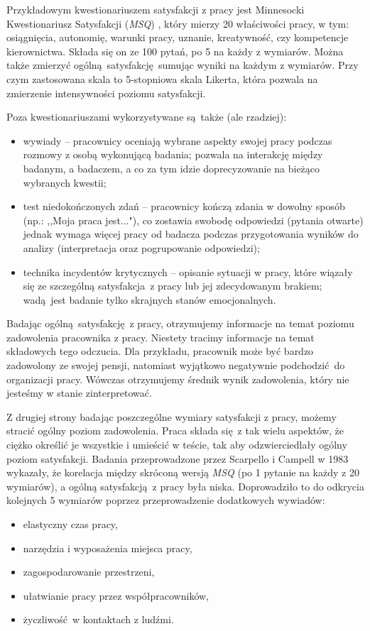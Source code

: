 Przykładowym kwestionariuszem satysfakcji z pracy jest Minnesocki Kwestionariusz Satysfakcji (\emph{MSQ}) \cite{weiss1967manual}, który mierzy 20 właściwości pracy, w tym: osiągnięcia, autonomię, warunki pracy, uznanie, kreatywność, czy kompetencje kierownictwa. Składa się on ze 100 pytań, po 5 na każdy z wymiarów. Można także zmierzyć
ogólną satysfakcję sumując wyniki na każdym z wymiarów. Przy czym zastosowana skala to 5-stopniowa skala Likerta, która pozwala na zmierzenie intensywności poziomu satysfakcji.

Poza kwestionariuszami wykorzystywane są także (ale rzadziej):
\begin{itemize}
\item wywiady -- pracownicy oceniają wybrane aspekty swojej pracy podczas rozmowy z osobą wykonującą badania; pozwala na interakcję między badanym, a badaczem, a co za tym idzie doprecyzowanie na bieżąco wybranych kwestii;
\item test niedokończonych zdań -- pracownicy kończą zdania w dowolny sposób (np.: ,,Moja praca jest..."), co zostawia swobodę odpowiedzi (pytania otwarte) jednak wymaga więcej pracy od badacza podczas przygotowania wyników do analizy (interpretacja oraz pogrupowanie odpowiedzi);
\item technika incydentów krytycznych -- opisanie sytuacji w pracy, które wiązały się ze szczególną satysfakcja z pracy lub jej zdecydowanym brakiem; wadą jest badanie tylko skrajnych stanów emocjonalnych.
\end{itemize}

Badając ogólną satysfakcję z pracy, otrzymujemy informacje na temat poziomu zadowolenia pracownika z pracy. Niestety tracimy informacje na temat składowych tego odczucia. Dla przykładu, pracownik może być bardzo zadowolony ze swojej pensji, natomiast wyjątkowo negatywnie podchodzić do organizacji pracy. Wówczas otrzymujemy średnik wynik zadowolenia, który nie jesteśmy w stanie zinterpretować.

Z drugiej strony badając poszczególne wymiary satysfakcji z pracy, możemy stracić ogólny poziom zadowolenia. Praca składa się z tak wielu aspektów, że ciężko określić je wszystkie i umieścić w teście, tak aby odzwierciedlały ogólny poziom satysfakcji. Badania przeprowadzone przez Scarpello i Campell w 1983 \cite{scarpello1983job} wykazały, że korelacja między skróconą wersją \emph{MSQ} (po 1 pytanie na każdy z 20 wymiarów), a ogólną satysfakcją z pracy była niska. Doprowadziło to do odkrycia
kolejnych 
5 wymiarów poprzez przeprowadzenie dodatkowych wywiadów:
\begin{itemize}
\item elastyczny czas pracy,
\item narzędzia i wyposażenia miejsca pracy,
\item zagospodarowanie przestrzeni,
\item ułatwianie pracy przez współpracowników,
\item życzliwość w kontaktach z ludźmi.
\end{itemize}
